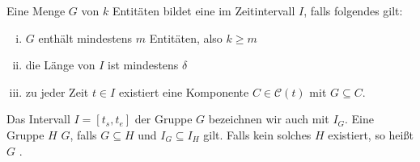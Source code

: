 \begin{definition}[{name=[Gruppe während eines Zeitraums]},label=def:gruppe]
	Eine Menge $G$ von $k$ Entitäten bildet eine  im Zeitintervall $I$, falls folgendes gilt:
	\begin{enumerate}[(i)]
		\item $G$ enthält mindestens $m$ Entitäten, also $k \ge m$
		\item die Länge von $I$ ist mindestens $\delta$
		\item \label{enum:3:def:gruppe}zu jeder Zeit $t \in I$ existiert eine Komponente $C \in \mathcal{C}(t)$ mit $G \subseteq C$.
	\end{enumerate}
	Das Intervall $I=[t_s,t_e]$ der Gruppe $G$ bezeichnen wir auch mit $I_G$.
	Eine Gruppe $H$  $G$, falls $G \subseteq H$ und $I_G \subseteq I_H$ gilt.
	Falls kein solches $H$ existiert, so heißt $G$ . 
\end{definition}

